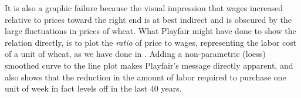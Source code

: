 It is also a graphic failure because the visual impression that wages increased relative to prices
toward the right end is at best indirect and is obscured by the large fluctuations in prices of wheat.
What Playfair might have done to show the relation directly, is to plot the \emph{ratio} of price to wages,
representing the labor cost of a unit of wheat, as we have done in .
Adding a non-parametric (loess) smoothed curve to the line plot makes Playfair's message directly apparent,
and also shows that the reduction in the amount of labor required to purchase one unit of week in fact
levels off in the last 40 years.
